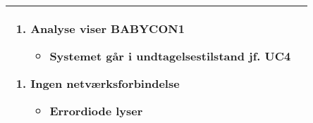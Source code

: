 \begin{center}
\begin{longtable}{|p{5cm}|p{9cm}|}
\begin{enumerate}[label=\ref{kravspec:uc3_lydanalyse}.d]
			\item Analyse viser BABYCON1
					\begin{itemize}
					\item Systemet går i undtagelsestilstand jf. UC4
					\end{itemize}
			\end{enumerate}
			\begin{enumerate}[label=\ref{kravspec:uc3_opdatering}.a]
			\item Ingen netværksforbindelse
					\begin{itemize}				
						\item Errordiode lyser
					\end{itemize}
			\end{enumerate}
		\\\hline
	\end{longtable} 
\end{center}

